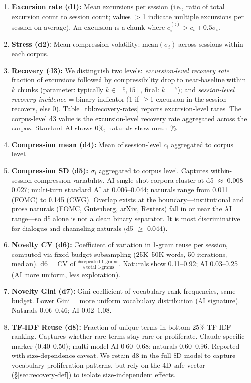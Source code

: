 \documentclass[final]{clv2025}
\begin{document}
\begin{enumerate}
\item \textbf{Excursion rate (d1):} Mean excursions per session (i.e., ratio of total excursion count to session count; values $>$1 indicate multiple excursions per session on average). An excursion is a chunk where $c_i^{(j)} > \bar{c}_i + 0.5 \sigma_i$.

\item \textbf{Stress (d2):} Mean compression volatility: $\text{mean}(\sigma_i)$ across sessions within each corpus.

\item \textbf{Recovery (d3):} We distinguish two levels: \textit{excursion-level recovery rate} = fraction of excursions followed by compressibility drop to near-baseline within $k$ chunks (parameter: typically $k \in [5, 15]$, final: $k=7$); and \textit{session-level recovery incidence} = binary indicator (1 if $\geq$1 excursion in the session recovers, else 0). Table~\ref{tbl:recovery-rates} reports excursion-level rates. The corpus-level d3 value is the excursion-level recovery rate aggregated across the corpus. Standard AI shows 0\%; naturals show mean \recNatCorpusAvg\%.

\item \textbf{Compression mean (d4):} Mean of session-level $\bar{c}_i$ aggregated to corpus level.

\item \textbf{Compression SD (d5):} $\sigma_i$ aggregated to corpus level. Captures within-session compression variability. AI single-shot corpora cluster at d5 $\approx$ 0.008--0.027; multi-turn standard AI at 0.006--0.044; naturals range from 0.011 (FOMC) to 0.145 (CWG). Overlap exists at the boundary---institutional and prose naturals (FOMC, Gutenberg, arXiv, Reuters) fall in or near the AI range---so d5 alone is not a clean binary separator. It is most discriminative for dialogue and channeling naturals (d5 $\geq$ 0.044).

\item \textbf{Novelty CV (d6):} Coefficient of variation in 1-gram reuse per session, computed via fixed-budget subsampling (25K--50K words, 50 iterations, median). d6 = CV of $\frac{\text{\#repeated 1-grams}}{\text{\#total 1-grams}}$. Naturals show 0.11--0.92; AI 0.03--0.25 (AI more uniform, less exploration).

\item \textbf{Novelty Gini (d7):} Gini coefficient of vocabulary rank frequencies, same budget. Lower Gini = more uniform vocabulary distribution (AI signature). Naturals 0.06--0.46; AI 0.02--0.08.

\item \textbf{TF-IDF Reuse (d8):} Fraction of unique terms in bottom 25\% TF-IDF ranking. Captures whether rare terms stay rare or proliferate. Claude-specific marker (0.40--0.50); multi-model AI 0.60--0.68; naturals 0.60--0.96. Reported with size-dependence caveat. We retain d8 in the full 8D model to capture vocabulary proliferation patterns, but rely on the 4D safe-vector (\S\ref{sec:recovery-def}) to isolate size-independent effects.
\end{enumerate}
\end{document}
